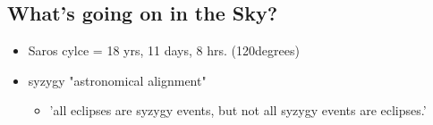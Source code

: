 \documentclass{article}
\begin{document}
\subsection{What's going on in the Sky?}
\begin{itemize}
\item Saros cylce = 18 yrs, 11 days, 8 hrs.  (120degrees)
\item syzygy  "astronomical alignment"
	\begin{itemize}
\item 'all eclipses are syzygy events, but not all syzygy events are eclipses.'
	\end{itemize}
\end{itemize}

\end{document}
